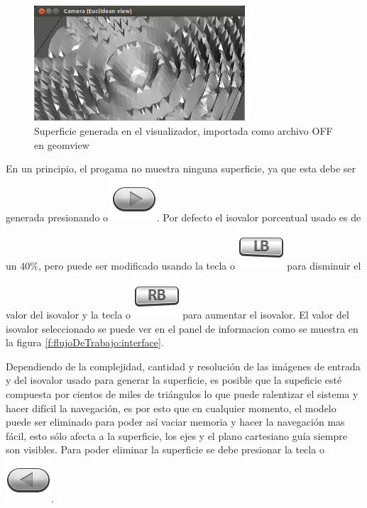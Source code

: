 \begin{figure}[!htb]
\centering
	\includegraphics[width=0.7\textwidth]{images/visualizer/geomview.png}
\caption{Superficie generada en el visualizador, importada como archivo OFF en \mbox{geomview}}
\label{f:flujoDeTrabajo:geomview}
\end{figure}

\newpage
En un principio, el progama no muestra ninguna superficie, ya que esta debe ser generada presionando  o \includegraphics[scale=0.4, trim= 0 20 0 0]{images/visualizer/xbox360/start.png}. Por defecto el isovalor porcentual usado es de un $40\%$, pero puede ser modificado usando la tecla  o \includegraphics[scale=0.4, trim= 0 20 0 0]{images/visualizer/xbox360/leftShoulder0.png} para disminuir el valor del isovalor y la tecla  o \includegraphics[scale=0.4, trim= 0 20 0 0]{images/visualizer/xbox360/rightShoulder0.png} para aumentar el isovalor. El valor del isovalor seleccionado se puede ver en el panel de informacion como se muestra en la figura \ref{f:flujoDeTrabajo:interface}.

Dependiendo de la complejidad, cantidad y resolución de las imágenes de entrada y del isovalor usado para generar la superficie, es posible que la supeficie esté compuesta por cientos de miles de triángulos lo que puede ralentizar el sistema y hacer difícil la navegación, es por esto que en cualquier momento, el modelo puede ser eliminado para poder así vaciar memoria y hacer la navegación mas fácil, esto sólo afecta a la superficie, los ejes y el plano cartesiano guía siempre son visibles. Para poder eliminar la superficie se debe presionar la tecla  o \includegraphics[scale=0.4, trim= 0 20 0 0]{images/visualizer/xbox360/select.png}.

